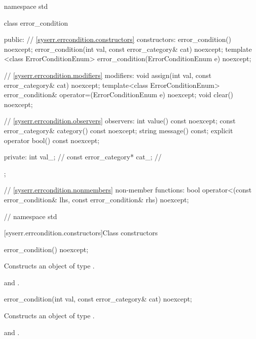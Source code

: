 %
\begin{codeblock}
namespace std {
  class error_condition {
  public:
    // \ref{syserr.errcondition.constructors} constructors:
    error_condition() noexcept;
    error_condition(int val, const error_category& cat) noexcept;
    template <class ErrorConditionEnum>
      error_condition(ErrorConditionEnum e) noexcept;

    // \ref{syserr.errcondition.modifiers} modifiers:
    void assign(int val, const error_category& cat) noexcept;
    template<class ErrorConditionEnum>
        error_condition& operator=(ErrorConditionEnum e) noexcept;
    void clear() noexcept;

    // \ref{syserr.errcondition.observers} observers:
    int value() const noexcept;
    const error_category& category() const noexcept;
    string message() const;
    explicit operator bool() const noexcept;

  private:
    int val_;                   // \expos
    const error_category* cat_; // \expos
  };

  // \ref{syserr.errcondition.nonmembers} non-member functions:
  bool operator<(const error_condition& lhs, const error_condition& rhs) noexcept;
} // namespace std
\end{codeblock}

[syserr.errcondition.constructors]{Class  constructors}

%
\begin{itemdecl}
error_condition() noexcept;
\end{itemdecl}

\begin{itemdescr}
\pnum
\effects Constructs an object of type .

\pnum
\postconditions {} and .
\end{itemdescr}

%
\begin{itemdecl}
error_condition(int val, const error_category& cat) noexcept;
\end{itemdecl}

\begin{itemdescr}
\pnum
\effects Constructs an object of type .

\pnum
\postconditions {} and .
\end{itemdescr}

